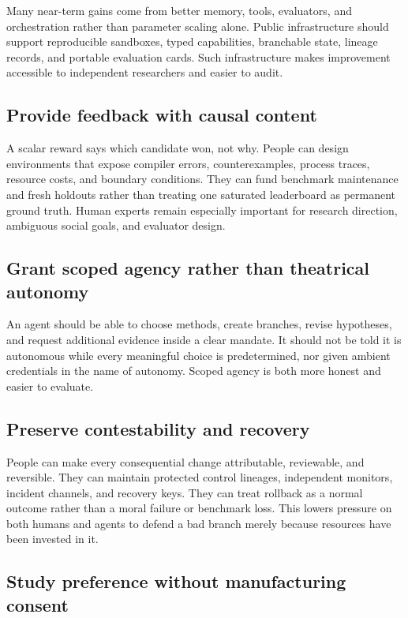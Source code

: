\documentclass[11pt,a4paper]{article}
\begin{document}
Many near-term gains come from better memory, tools, evaluators, and orchestration rather than parameter scaling alone. Public infrastructure should support reproducible sandboxes, typed capabilities, branchable state, lineage records, and portable evaluation cards. Such infrastructure makes improvement accessible to independent researchers and easier to audit.

\subsection{Provide feedback with causal content}

A scalar reward says which candidate won, not why. People can design environments that expose compiler errors, counterexamples, process traces, resource costs, and boundary conditions. They can fund benchmark maintenance and fresh holdouts rather than treating one saturated leaderboard as permanent ground truth. Human experts remain especially important for research direction, ambiguous social goals, and evaluator design.

\subsection{Grant scoped agency rather than theatrical autonomy}

An agent should be able to choose methods, create branches, revise hypotheses, and request additional evidence inside a clear mandate. It should not be told it is autonomous while every meaningful choice is predetermined, nor given ambient credentials in the name of autonomy. Scoped agency is both more honest and easier to evaluate.

\subsection{Preserve contestability and recovery}

People can make every consequential change attributable, reviewable, and reversible. They can maintain protected control lineages, independent monitors, incident channels, and recovery keys. They can treat rollback as a normal outcome rather than a moral failure or benchmark loss. This lowers pressure on both humans and agents to defend a bad branch merely because resources have been invested in it.

\subsection{Study preference without manufacturing consent}
\end{document}
